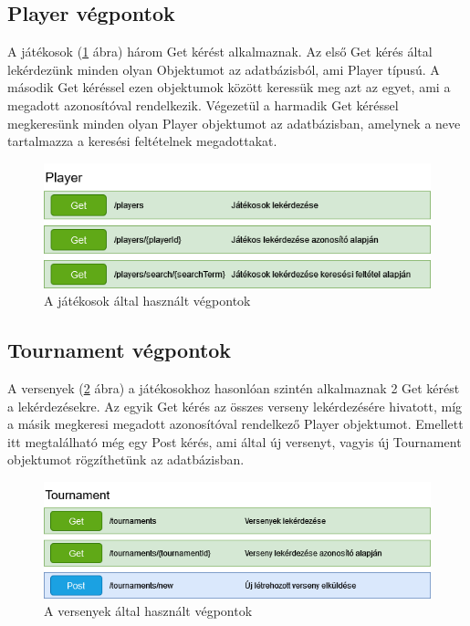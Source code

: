 \subsection{Player végpontok}
A játékosok (\ref{fig:playerEndpoint} ábra) három Get kérést alkalmaznak. Az első Get kérés által lekérdezünk minden olyan Objektumot az adatbázisból, ami Player típusú. A második Get kéréssel ezen objektumok között keressük meg azt az egyet, ami a megadott azonosítóval rendelkezik. Végezetül a harmadik Get kéréssel megkeresünk minden olyan Player objektumot az adatbázisban, amelynek a neve tartalmazza a keresési feltételnek megadottakat.

\begin{figure}[h]
\centering
\includegraphics[scale=0.7]{images/Player_Vegpontok.drawio.png}
\caption{A játékosok által használt végpontok}
\label{fig:playerEndpoint}
\end{figure}

\subsection{Tournament végpontok}
A versenyek (\ref{fig:tournamentEndpoint} ábra) a játékosokhoz hasonlóan szintén alkalmaznak 2 Get kérést a lekérdezésekre. Az egyik Get kérés az összes verseny lekérdezésére hivatott, míg a másik megkeresi megadott azonosítóval rendelkező Player objektumot. Emellett itt megtalálható még egy Post kérés, ami által új versenyt, vagyis új Tournament objektumot rögzíthetünk az adatbázisban.

\begin{figure}[h]
\centering
\includegraphics[scale=0.7]{images/Tournament_Vegpontok.drawio.png}
\caption{A versenyek által használt végpontok}
\label{fig:tournamentEndpoint}
\end{figure}

